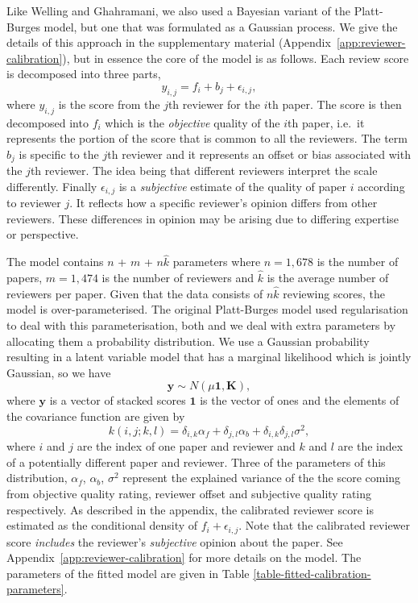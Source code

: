 \documentclass[twoside]{article}
\begin{document}
Like Welling and Ghahramani, we also used a Bayesian variant of the Platt-Burges model, but one that was
formulated as a Gaussian process. We give the details of this approach
in the supplementary material (Appendix~\ref{app:reviewer-calibration}),
but in essence the core of the model is as follows. Each review score
is decomposed into three parts,
$$
y_{i,j} = f_i + b_j + \epsilon_{i, j},
$$
where $y_{i,j}$ is the score from the $j$th reviewer for the $i$th
paper. The score is then decomposed into $f_i$ which is the
\emph{objective} quality of the $i$th paper, i.e.\ it represents the
portion of the score that is common to all the reviewers. The term
$b_j$ is specific to the $j$th reviewer and it represents an offset or
bias associated with the $j$th reviewer. The idea being that different
reviewers interpret the scale differently. Finally $\epsilon_{i,j}$ is
a \emph{subjective} estimate of the quality of paper $i$ according to
reviewer $j$. It reflects how a specific reviewer's opinion differs
from other reviewers. These differences in opinion may be arising due
to differing expertise or perspective.

The model contains $n$ + $m$ + $n\hat{k}$ parameters where $n=1,678$
is the number of papers, $m=1,474$ is the number of reviewers and
$\hat{k}$ is the average number of reviewers per paper. Given that the
data consists of $n\hat{k}$ reviewing scores, the model is
over-parameterised. The original Platt-Burges model used
regularisation to deal with this parameterisation, both
\cite{Ge-bayesian15} and we deal with extra
parameters by allocating them a probability distribution. We use a Gaussian probability resulting in a latent
variable model that has a marginal likelihood which is jointly
Gaussian, so we have
$$
\mathbf{y} \sim N(\mu \mathbf{1}, \mathbf{K}),
$$
where $\mathbf{y}$ is a vector of stacked scores $\mathbf{1}$ is
the vector of ones and the elements of the covariance function are given
by
$$
k(i,j; k,l) = \delta_{i,k} \alpha_f + \delta_{j,l} \alpha_b + \delta_{i, k}\delta_{j,l} \sigma^2,
$$ where $i$ and $j$ are the index of one paper and reviewer and $k$
and $l$ are the index of a potentially different paper and
reviewer. Three of the parameters of this distribution, $\alpha_f$,
$\alpha_b$, $\sigma^2$ represent the explained variance of the the
score coming from objective quality rating, reviewer offset and
subjective quality rating respectively. As described in the appendix,
the calibrated reviewer score is estimated as the conditional density
of $f_i + \epsilon_{i,j}$. Note that the calibrated reviewer score
\emph{includes} the reviewer's \emph{subjective} opinion about the
paper. See Appendix~\ref{app:reviewer-calibration} for more details
on the model. The parameters of the fitted model are given in
Table \ref{table-fitted-calibration-parameters}.
\end{document}
